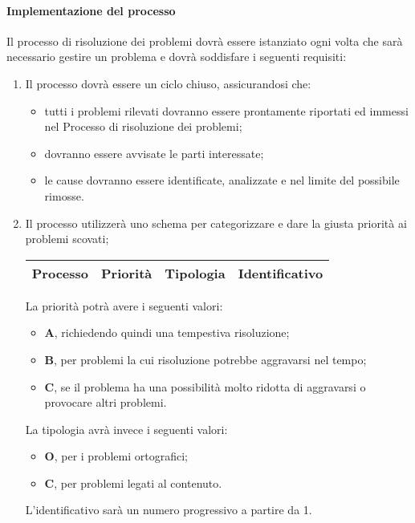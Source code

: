 		\paragraph{Implementazione del processo}
			Il processo di risoluzione dei problemi dovrà essere istanziato ogni volta che sarà necessario gestire un problema e dovrà soddisfare i seguenti requisiti:
			\begin{enumerate}
				\item Il processo dovrà essere un ciclo chiuso, assicurandosi che:
					\begin{itemize}
				 		\item tutti i problemi rilevati dovranno essere prontamente riportati ed immessi nel Processo di risoluzione dei problemi;
					 	\item dovranno essere avvisate le parti interessate;
				 		\item le cause dovranno essere identificate, analizzate e nel limite del possibile rimosse.
					 \end{itemize}

				\item Il processo utilizzerà uno schema per categorizzare e dare la giusta priorità ai problemi scovati;

					\begin{center}
						\begin{longtable}{|c|c|c|c|}
							\hline
							\rowcolor{lighter-grayer}
							\textbf{Processo} & \textbf{Priorità} & \textbf{Tipologia} & \textbf{Identificativo}\\
							\hline
							\endfirsthead
							\hline

						\end{longtable}
					\end{center}

				 La priorità potrà avere i seguenti valori:
					\begin{itemize}
					 	\item \textbf{A}, richiedendo quindi una tempestiva risoluzione;
					 	\item \textbf{B}, per problemi la cui risoluzione potrebbe aggravarsi nel tempo;
					 	\item \textbf{C}, se il problema ha una possibilità molto ridotta di aggravarsi o provocare altri problemi.
					 \end{itemize}
				 La tipologia avrà invece i seguenti valori:
					\begin{itemize}
						\item \textbf{O}, per i problemi ortografici;
						\item \textbf{C}, per problemi legati al contenuto.
					\end{itemize}
				 L'identificativo sarà un numero progressivo a partire da 1.


\end{enumerate}
